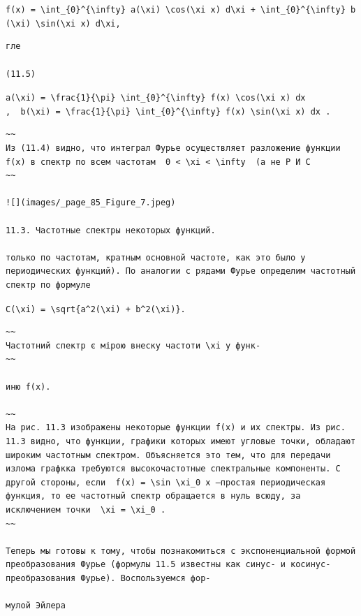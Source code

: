 \documentclass[
  ukrainian,
]{article}
\begin{document}
\texttt{f(x)\ =\ \textbackslash{}int\_\{0\}\^{}\{\textbackslash{}infty\}\ a(\textbackslash{}xi)\ \textbackslash{}cos(\textbackslash{}xi\ x)\ d\textbackslash{}xi\ +\ \textbackslash{}int\_\{0\}\^{}\{\textbackslash{}infty\}\ b(\textbackslash{}xi)\ \textbackslash{}sin(\textbackslash{}xi\ x)\ d\textbackslash{}xi,}

\begin{verbatim}
гле

(11.5)
\end{verbatim}

\texttt{a(\textbackslash{}xi)\ =\ \textbackslash{}frac\{1\}\{\textbackslash{}pi\}\ \textbackslash{}int\_\{0\}\^{}\{\textbackslash{}infty\}\ f(x)\ \textbackslash{}cos(\textbackslash{}xi\ x)\ dx}
\texttt{,\ \ b(\textbackslash{}xi)\ =\ \textbackslash{}frac\{1\}\{\textbackslash{}pi\}\ \textbackslash{}int\_\{0\}\^{}\{\textbackslash{}infty\}\ f(x)\ \textbackslash{}sin(\textbackslash{}xi\ x)\ dx\ .}

\begin{verbatim}
~~
Из (11.4) видно, что интеграл Фурье осуществляет разложение функции f(x) в спектр по всем частотам  0 < \xi < \infty  (а не Р И С
~~

![](images/_page_85_Figure_7.jpeg)

11.3. Частотные спектры некоторых функций.

только по частотам, кратным основной частоте, как это было у периодических функций). По аналогии с рядами Фурье определим частотный спектр по формуле
\end{verbatim}

\texttt{C(\textbackslash{}xi)\ =\ \textbackslash{}sqrt\{a\^{}2(\textbackslash{}xi)\ +\ b\^{}2(\textbackslash{}xi)\}.}

\begin{verbatim}
~~
Частотний спектр є мірою внеску частоти \xi у функ-
~~

иню f(x).

~~
На рис. 11.3 изображены некоторые функции f(x) и их спектры. Из рис. 11.3 видно, что функции, графики которых имеют угловые точки, обладают широким частотным спектром. Объясняется это тем, что для передачи излома графкка требуются высокочастотные спектральные компоненты. С другой стороны, если  f(x) = \sin \xi_0 x —простая периодическая функция, то ее частотный спектр обращается в нуль всюду, за исключением точки  \xi = \xi_0 .
~~

Теперь мы готовы к тому, чтобы познакомиться с экспоненциальной формой преобразования Фурье (формулы 11.5 известны как синус- и косинус-преобразования Фурье). Воспользуемся фор-

мулой Эйлера
\end{verbatim}
\end{document}
